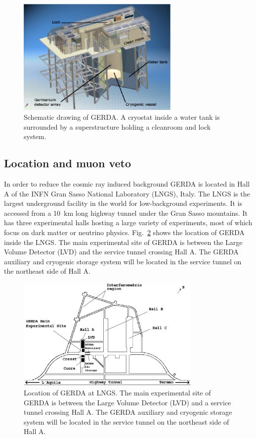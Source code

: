 \begin{figure}[tbhp]
  \centering
  \includegraphics[width=0.7\textwidth]{gerda}  
  \caption{Schematic drawing of GERDA. A cryostat inside a water tank     is surrounded by a superstructure holding a cleanroom and lock     system.}
  \label{fig:gerda}
\end{figure}

\subsection{Location and muon veto}
\label{sec:gerda:loca}
In order to reduce the cosmic ray induced background GERDA is located in Hall A of the INFN Gran Sasso National Laboratory (LNGS), Italy. The LNGS is the largest underground facility in the world for low-background experiments. It is accessed from a 10~km long highway tunnel under the Gran Sasso mountains. It has three experimental halls hosting a large variety of experiments, most of which focus on dark matter or neutrino physics. Fig.~\ref{fig:lngs} shows the location of GERDA inside the LNGS. The main experimental site of GERDA is between the Large Volume Detector (LVD) and the service tunnel crossing Hall A. The GERDA auxiliary and cryogenic storage system will be located in the service tunnel on the northeast side of Hall A.

\begin{figure}[tbhp]
  \centering
  \includegraphics[width=0.8\textwidth]{lngs}  
  \caption{Location of GERDA at LNGS. The main experimental site of     GERDA is between the Large Volume Detector (LVD) and a service     tunnel crossing Hall A. The GERDA auxiliary and cryogenic storage     system will be located in the service tunnel on the northeast side     of Hall A.}
  \label{fig:lngs}
\end{figure}

